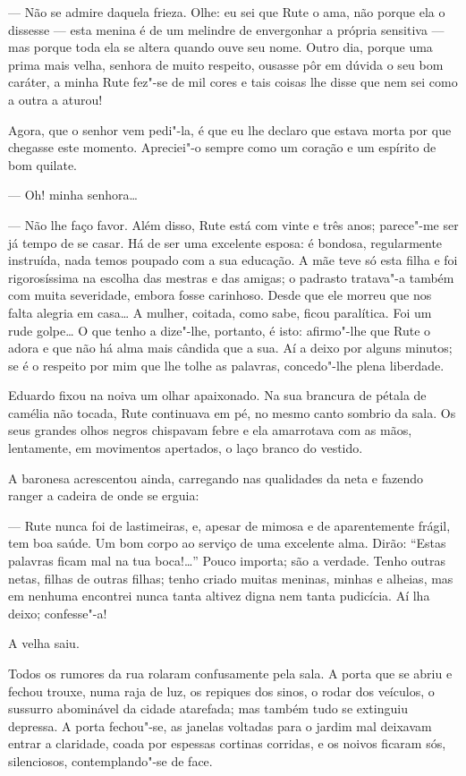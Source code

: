 --- Não se admire daquela frieza. Olhe: eu sei que Rute o ama, não porque
ela o dissesse --- esta menina é de um melindre de envergonhar a própria
sensitiva --- mas porque toda ela se altera quando ouve seu nome. Outro
dia, porque uma prima mais velha, senhora de muito respeito, ousasse pôr
em dúvida o seu bom caráter, a minha Rute fez"-se de mil cores e tais
coisas lhe disse que nem sei como a outra a aturou!

Agora, que o senhor vem pedi"-la, é que eu lhe declaro que estava morta
por que chegasse este momento. Apreciei"-o sempre como um coração e um
espírito de bom quilate.

--- Oh! minha senhora\ldots{}

--- Não lhe faço favor. Além disso, Rute está com vinte e três anos;
parece"-me ser já tempo de se casar. Há de ser uma excelente esposa: é
bondosa, regularmente instruída, nada temos poupado com a sua educação.
A mãe teve só esta filha e foi rigorosíssima na escolha das mestras e
das amigas; o padrasto tratava"-a também com muita severidade, embora
fosse carinhoso. Desde que ele morreu que nos falta alegria em casa\ldots{} A
mulher, coitada, como sabe, ficou paralítica. Foi um rude golpe\ldots{} O que
tenho a dize"-lhe, portanto, é isto: afirmo"-lhe que Rute o adora e que
não há alma mais cândida que a sua. Aí a deixo por alguns minutos; se é
o respeito por mim que lhe tolhe as palavras, concedo"-lhe plena
liberdade.

Eduardo fixou na noiva um olhar apaixonado. Na sua brancura de pétala de
camélia não tocada, Rute continuava em pé, no mesmo canto sombrio da
sala. Os seus grandes olhos negros chispavam febre e ela amarrotava com
as mãos, lentamente, em movimentos apertados, o laço branco do vestido.

A baronesa acrescentou ainda, carregando nas qualidades da neta e
fazendo ranger a cadeira de onde se erguia:

--- Rute nunca foi de lastimeiras, e, apesar de mimosa e de aparentemente
frágil, tem boa saúde. Um bom corpo ao serviço de uma excelente alma.
Dirão: ``Estas palavras ficam mal na tua boca!\ldots{}'' Pouco importa; são a
verdade. Tenho outras netas, filhas de outras filhas; tenho criado
muitas meninas, minhas e alheias, mas em nenhuma encontrei nunca tanta
altivez digna nem tanta pudicícia. Aí lha deixo; confesse"-a!

A velha saiu.

Todos os rumores da rua rolaram confusamente pela sala. A porta que se
abriu e fechou trouxe, numa raja de luz, os repiques dos sinos, o rodar
dos veículos, o sussurro abominável da cidade atarefada; mas também tudo
se extinguiu depressa. A porta fechou"-se, as janelas voltadas para o
jardim mal deixavam entrar a claridade, coada por espessas cortinas
corridas, e os noivos ficaram sós, silenciosos, contemplando"-se de face.

